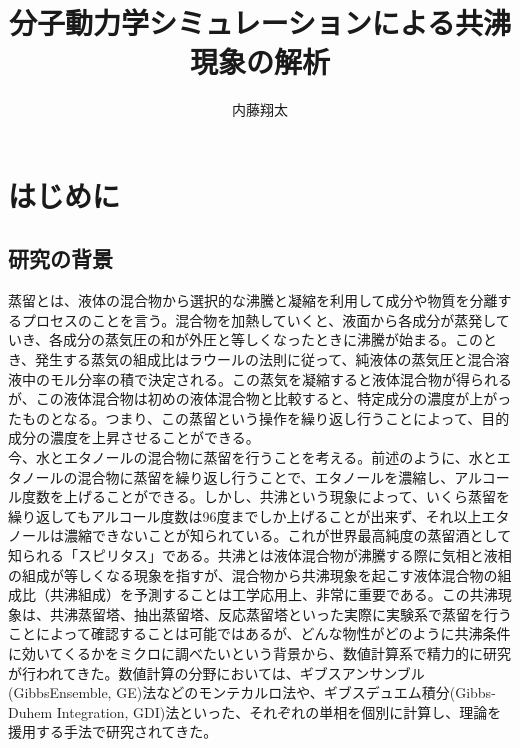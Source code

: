 \documentclass[titlepage]{jsreport}
\title{分子動力学シミュレーションによる共沸現象の解析}
\author{内藤翔太}
\begin{document}
\maketitle
{}

\tableofcontents
\pagestyle{plain}
\setcounter{page}{1}

\chapter{はじめに} \label{chap:introduction}


\section{研究の背景} \label{introduction:background}
蒸留とは、液体の混合物から選択的な沸騰と凝縮を利用して成分や物質を分離するプロセスのことを言う。混合物を加熱していくと、液面から各成分が蒸発していき、各成分の蒸気圧の和が外圧と等しくなったときに沸騰が始まる。このとき、発生する蒸気の組成比はラウールの法則に従って、純液体の蒸気圧と混合溶液中のモル分率の積で決定される。この蒸気を凝縮すると液体混合物が得られるが、この液体混合物は初めの液体混合物と比較すると、特定成分の濃度が上がったものとなる。つまり、この蒸留という操作を繰り返し行うことによって、目的成分の濃度を上昇させることができる。\\
今、水とエタノールの混合物に蒸留を行うことを考える。前述のように、水とエタノールの混合物に蒸留を繰り返し行うことで、エタノールを濃縮し、アルコール度数を上げることができる。しかし、共沸という現象によって、いくら蒸留を繰り返してもアルコール度数は96度までしか上げることが出来ず、それ以上エタノールは濃縮できないことが知られている。これが世界最高純度の蒸留酒として知られる「スピリタス」である。共沸とは液体混合物が沸騰する際に気相と液相の組成が等しくなる現象を指すが、混合物から共沸現象を起こす液体混合物の組成比（共沸組成）を予測することは工学応用上、非常に重要である。この共沸現象は、共沸蒸留塔、抽出蒸留塔、反応蒸留塔といった実際に実験系で蒸留を行うことによって確認することは可能ではあるが、どんな物性がどのように共沸条件に効いてくるかをミクロに調べたいという背景から、数値計算系で精力的に研究が行われてきた。数値計算の分野においては、ギブスアンサンブル(GibbsEnsemble, GE)法などのモンテカルロ法や、ギブスデュエム積分(Gibbs-Duhem Integration, GDI)法といった、それぞれの単相を個別に計算し、理論を援用する手法で研究されてきた。
\end{document}
